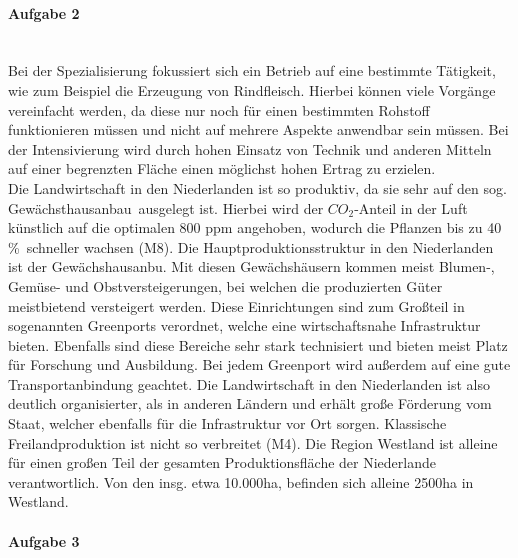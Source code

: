 \documentclass[12pt, a4paper]{report}
\begin{document}
	\newpage
	\paragraph{Aufgabe 2} \mbox{} \\
	Bei der Spezialisierung fokussiert sich ein Betrieb auf eine bestimmte Tätigkeit, wie zum Beispiel die Erzeugung von Rindfleisch.
	Hierbei können viele Vorgänge vereinfacht werden, da diese nur noch für einen bestimmten Rohstoff funktionieren müssen und nicht auf mehrere Aspekte anwendbar sein müssen.
	Bei der Intensivierung wird durch hohen Einsatz von Technik und anderen Mitteln auf einer begrenzten Fläche einen möglichst hohen Ertrag zu erzielen. \\
	Die Landwirtschaft in den Niederlanden ist so produktiv, da sie sehr auf den sog. \dq Gewächsthausanbau\dq\ ausgelegt ist.
	Hierbei wird der $CO_2$-Anteil in der Luft künstlich auf die optimalen 800 ppm angehoben, wodurch die Pflanzen bis zu 40 \%\ schneller wachsen (M8).
	Die Hauptproduktionsstruktur in den Niederlanden ist der Gewächshausanbu.
	Mit diesen Gewächshäusern kommen meist Blumen-, Gemüse- und Obstversteigerungen, bei welchen die produzierten Güter meistbietend versteigert werden.
	Diese Einrichtungen sind zum Großteil in sogenannten Greenports verordnet, welche eine wirtschaftsnahe Infrastruktur bieten.
	Ebenfalls sind diese Bereiche sehr stark technisiert und bieten meist Platz für Forschung und Ausbildung.
	Bei jedem Greenport wird außerdem auf eine gute Transportanbindung geachtet.
	Die Landwirtschaft in den Niederlanden ist also deutlich organisierter, als in anderen Ländern und erhält große Förderung vom Staat, welcher ebenfalls für die Infrastruktur vor Ort sorgen.
	Klassische Freilandproduktion ist nicht so verbreitet (M4).
	Die Region Westland ist alleine für einen großen Teil der gesamten Produktionsfläche der Niederlande verantwortlich.
	Von den insg. etwa 10.000ha, befinden sich alleine 2500ha in Westland.
	\newpage
	\paragraph{Aufgabe 3}
	
\end{document}
